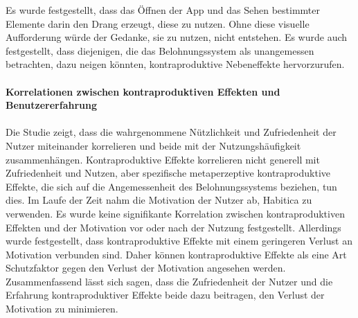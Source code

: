 \documentclass[sigconf, nonacm]{acmart}
\begin{document}
Es wurde festgestellt, dass das Öffnen der App und das Sehen bestimmter Elemente darin den Drang erzeugt, diese zu nutzen. Ohne diese visuelle Aufforderung würde der Gedanke, sie zu nutzen, nicht entstehen. Es wurde auch festgestellt, dass diejenigen, die das Belohnungssystem als unangemessen betrachten, dazu neigen könnten, kontraproduktive Nebeneffekte hervorzurufen.
\\
\\
\textbf{Korrelationen zwischen kontraproduktiven Effekten und Benutzererfahrung}
\\
\\
Die Studie zeigt, dass die wahrgenommene Nützlichkeit und Zufriedenheit der Nutzer miteinander korrelieren und beide mit der Nutzungshäufigkeit zusammenhängen. Kontraproduktive Effekte korrelieren nicht generell mit Zufriedenheit und Nutzen, aber spezifische metaperzeptive kontraproduktive Effekte, die sich auf die Angemessenheit des Belohnungssystems beziehen, tun dies. Im Laufe der Zeit nahm die Motivation der Nutzer ab, Habitica zu verwenden. Es wurde keine signifikante Korrelation zwischen kontraproduktiven Effekten und der Motivation vor oder nach der Nutzung festgestellt. Allerdings wurde festgestellt, dass kontraproduktive Effekte mit einem geringeren Verlust an Motivation verbunden sind. Daher können kontraproduktive Effekte als eine Art Schutzfaktor gegen den Verlust der Motivation angesehen werden. Zusammenfassend lässt sich sagen, dass die Zufriedenheit der Nutzer und die Erfahrung kontraproduktiver Effekte beide dazu beitragen, den Verlust der Motivation zu minimieren.
\end{document}
